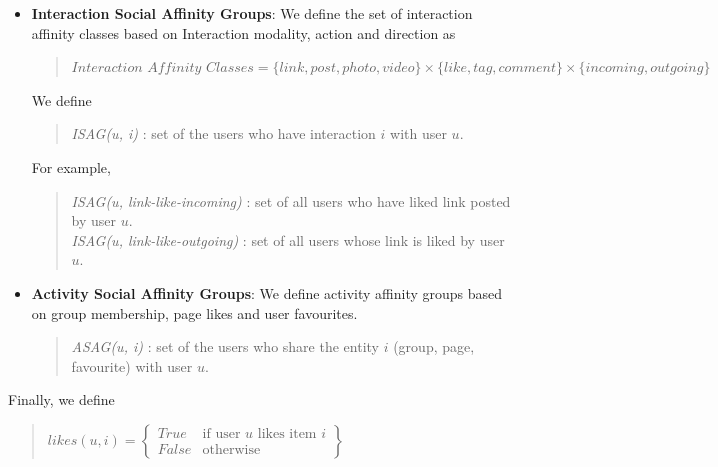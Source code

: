 \begin{itemize}
  \item \textbf{Interaction  Social Affinity Groups}: We define the set of interaction affinity classes based on 
  Interaction modality, action and direction as
  \begin{quote}
  \begin{math}
  	\textit{Interaction Affinity Classes} = \{link, post, photo, video\} \times \{like, tag, comment\} \times \{incoming, outgoing\}
  \end{math}
  \end{quote}
  We define 
  \begin{quote}
  \textit{ISAG(u, i)} : set of the users who have interaction $i$ with user $u$.
  \end{quote}
   For example,
   \begin{quote}
   
   \textit{ISAG(u, link-like-incoming)} : set of all users who have liked link posted by user $u$. \\
   \textit{ISAG(u, link-like-outgoing)} : set of all users whose link is liked by user $u$. \\
   \end{quote}
\item \textbf{Activity Social Affinity Groups}: We define activity affinity groups based on group membership, page likes and user favourites.
	\begin{quote}
	\textit{ASAG(u, i)} : set of the users who share the entity $i$ (group, page, favourite) with user $u$.   
	\end{quote}
\end{itemize}
Finally, we define
\begin{quote}
\begin{math}
likes(u,i) =  \begin{Bmatrix}
	  True & \text{if user $u$ likes item $i$}\\
	  False & \text{otherwise}
	  \end{Bmatrix}
\end{math}
\end{quote}
